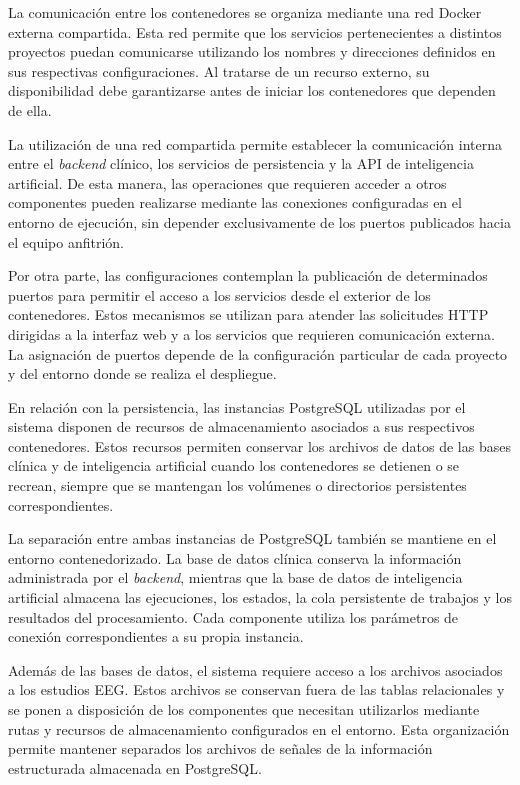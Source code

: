 La comunicación entre los contenedores se organiza mediante
una red Docker externa compartida. Esta red permite que los servicios
pertenecientes a distintos proyectos puedan comunicarse
utilizando los nombres y direcciones definidos en sus
respectivas configuraciones. Al tratarse de un recurso
externo, su disponibilidad debe garantizarse antes de
iniciar los contenedores que dependen de ella.

La utilización de una red compartida permite establecer
la comunicación interna entre el \textit{backend} clínico, los
servicios de persistencia y la API de inteligencia
artificial. De esta manera, las operaciones que requieren
acceder a otros componentes pueden realizarse mediante
las conexiones configuradas en el entorno de ejecución,
sin depender exclusivamente de los puertos publicados
hacia el equipo anfitrión.

Por otra parte, las configuraciones contemplan la
publicación de determinados puertos para permitir
el acceso a los servicios desde el exterior de los
contenedores. Estos mecanismos se utilizan para
atender las solicitudes HTTP dirigidas a la interfaz
web y a los servicios que requieren comunicación
externa. La asignación de puertos depende de la
configuración particular de cada proyecto y del
entorno donde se realiza el despliegue.


En relación con la persistencia, las instancias
PostgreSQL utilizadas por el sistema disponen de
recursos de almacenamiento asociados a sus
respectivos contenedores. Estos recursos permiten
conservar los archivos de datos de las bases clínica
y de inteligencia artificial cuando los contenedores
se detienen o se recrean, siempre que se mantengan
los volúmenes o directorios persistentes
correspondientes.


La separación entre ambas instancias de PostgreSQL
también se mantiene en el entorno contenedorizado.
La base de datos clínica conserva la información
administrada por el \textit{backend}, mientras que la base
de datos de inteligencia artificial almacena las
ejecuciones, los estados, la cola persistente de
trabajos y los resultados del procesamiento.
Cada componente utiliza los parámetros de conexión
correspondientes a su propia instancia.

Además de las bases de datos, el sistema requiere
acceso a los archivos asociados a los estudios EEG.
Estos archivos se conservan fuera de las tablas
relacionales y se ponen a disposición de los
componentes que necesitan utilizarlos mediante
rutas y recursos de almacenamiento configurados
en el entorno. Esta organización permite mantener
separados los archivos de señales de la información
estructurada almacenada en PostgreSQL.


